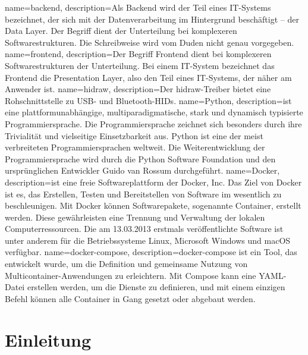 \documentclass[a4paper,
    11pt,
    headings=small,
    ngerman,
    listof=totoc,
    numbers=noenddot]{scrreprt}[2021/11/13]
\begin{document}
{
  name=backend,
  description={Als Backend wird der Teil eines IT-Systems bezeichnet, der sich mit der Datenverarbeitung im Hintergrund beschäftigt – der Data Layer. Der Begriff dient der Unterteilung bei komplexeren Softwarestrukturen. Die Schreibweise wird vom Duden nicht genau vorgegeben. \autocite{backend_definition}}
}
{
  name=frontend,
  description={Der Begriff Frontend dient bei komplexeren Softwarestrukturen der Unterteilung. Bei einem IT-System bezeichnet das Frontend die Presentation Layer, also den Teil eines IT-Systems, der näher am Anwender ist. \autocite{frontend_definition}}
}
{
  name=hidraw,
  description={Der hidraw-Treiber bietet eine Rohschnittstelle zu USB- und Bluetooth-\ac{HIDs}.}
}
{
  name=Python,
  description={ist eine plattformunabhängige, multiparadigmatische, stark und dynamisch typisierte Programmiersprache.
      Die Programmiersprache zeichnet sich besonders durch ihre Trivialität und vielseitige Einsetzbarkeit aus.
      Python ist eine der meist verbreiteten Programmiersprachen weltweit.
      Die Weiterentwicklung der Programmiersprache wird durch die Python Software Foundation und den ursprünglichen Entwickler Guido van Rossum durchgeführt. \autocite{python}}
}
{
  name=Docker,
  description={ist eine freie Softwareplattform der Docker, Inc. Das Ziel von Docker ist es, das Erstellen, Testen und Bereitstellen von Software im wesentlich zu beschleunigen.
      Mit Docker können Softwarepakete, sogenannte Container, erstellt werden. Diese gewährleisten eine Trennung und Verwaltung der lokalen Computerressourcen.
      Die am 13.03.2013 erstmals veröffentlichte Software ist unter anderem für die Betriebssysteme Linux, Microsoft Windows und macOS verfügbar. \autocite{docker_setup} \autocite{docker_install}}
}
{
  name=docker-compose,
  description={docker-compose ist ein Tool, das entwickelt wurde, um die Definition und gemeinsame Nutzung von Multicontainer-Anwendungen zu erleichtern. Mit Compose kann eine YAML-Datei erstellen werden, um die Dienste zu definieren, und mit einem einzigen Befehl können alle Container in Gang gesetzt oder abgebaut werden. \autocite{docker_install}}
}

\newpage


\chapter{Einleitung}
\end{document}
